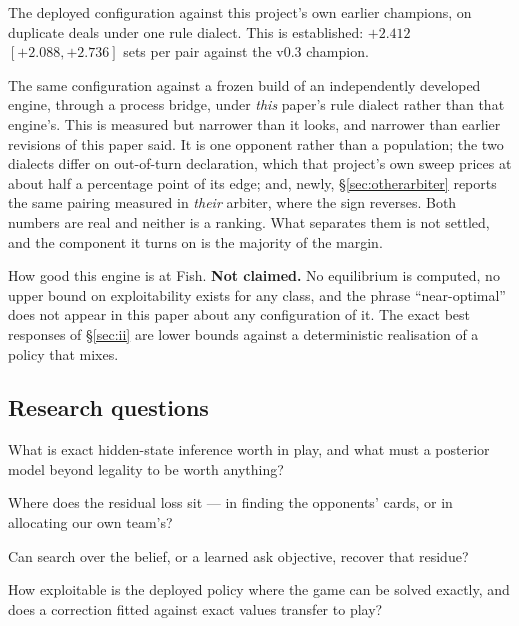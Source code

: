 \documentclass[11pt,letterpaper]{article}
\begin{document}
\begin{description}[leftmargin=1.6em,style=nextline,itemsep=2pt]
\item[Lineage strength] The deployed configuration against this project's own
earlier champions, on duplicate deals under one rule dialect. This is
established: $+2.412$ $[+2.088, +2.736]$ sets per pair against the v0.3
champion.
\item[Cross-engine strength] The same configuration against a frozen build of
an independently developed engine, through a
process bridge, under \emph{this} paper's rule dialect rather than that
engine's. This is measured but narrower than it looks, and narrower than
earlier revisions of this paper said. It is one opponent rather than a
population; the two dialects differ on out-of-turn declaration, which that
project's own sweep prices at about half a percentage point of its edge; and,
newly, \S\ref{sec:otherarbiter} reports the same pairing measured in
\emph{their} arbiter, where the sign reverses. Both numbers are real and
neither is a ranking. What separates them is not settled, and the component it
turns on is the majority of the margin.
\item[Global standing] How good this engine is at Fish. \textbf{Not claimed.}
No equilibrium is computed, no upper bound on exploitability exists for any
class, and the phrase ``near-optimal'' does not appear in this paper about any
configuration of it. The exact best responses of \S\ref{sec:ii} are lower
bounds against a deterministic realisation of a policy that mixes.
\end{description}

\subsection{Research questions}
\label{sec:rqs}

\begin{description}[leftmargin=2.6em,style=nextline,itemsep=2pt]
\item[RQ1] What is exact hidden-state inference worth in play, and what must a
posterior model beyond legality to be worth anything?
\item[RQ2] Where does the residual loss sit --- in finding the opponents'
cards, or in allocating our own team's?
\item[RQ3] Can search over the belief, or a learned ask objective, recover
that residue?
\item[RQ4] How exploitable is the deployed policy where the game can be solved
exactly, and does a correction fitted against exact values transfer to play?
\end{description}
\end{document}
